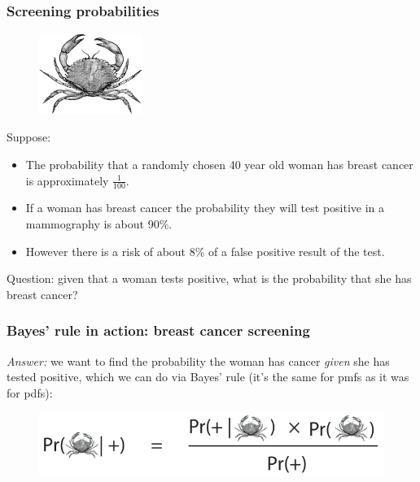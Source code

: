 \documentclass{beamer}
\begin{document}
	\begin{frame}
		\frametitle{Screening probabilities}
		
		
		\begin{figure}[ht]
			\includegraphics[width=0.3\textwidth]{./figures/crab2.jpeg}
		\end{figure}
		
		Suppose:
		\begin{itemize}
			\item The probability that a randomly chosen 40 year old woman has breast cancer is approximately $\frac{1}{100}$.
			\item If a woman has breast cancer the probability they will test positive in a mammography is about 90\%.
			\item However there is a risk of about 8\% of a false positive result of the test.
		\end{itemize}
		
	Question: given that a woman tests positive, what is the probability that she has breast cancer?
		
	\end{frame}
	
	\begin{frame}
		\frametitle{Bayes' rule in action: breast cancer screening}
		
		\textit{Answer:} we want to find the probability the woman has cancer \textit{given} she has tested positive, which we can do via Bayes' rule (it's the same for pmfs as it was for pdfs):
		
		\begin{figure}[ht]
			\includegraphics[width=1\textwidth]{./figures/lec1_cancer.pdf}
		\end{figure}
		
	\end{frame}
	
\end{document}
